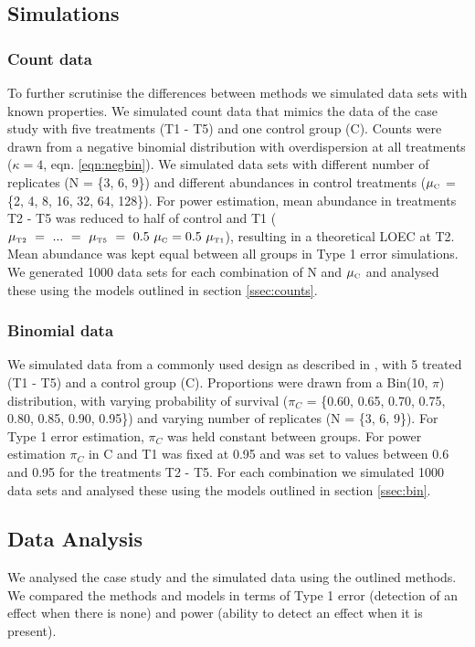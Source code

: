 \documentclass[twocolumn, natbib]{svjour3}
\begin{document}
\subsection{Simulations}
\subsubsection{Count data}
To further scrutinise the differences between methods we simulated data sets with known properties.
We simulated count data that mimics the data of the case study with five treatments (T1 - T5) and one control group (C).
Counts were drawn from a negative binomial distribution with overdispersion at all treatments ($\kappa = 4$, eqn. \ref{eqn:negbin}).
We simulated data sets with different number of replicates (N = \{3, 6, 9\}) and different abundances in control treatments ($\mu_\text{\tiny C}$ = \{2, 4, 8, 16, 32, 64, 128\}). 
For power estimation, mean abundance in treatments T2 - T5 was reduced to half of control and T1 ($\mu_\text{\tiny T2}~=~...~=~\mu_\text{\tiny T5}~=~0.5~\mu_\text{\tiny C} = 0.5~\mu_\text{\tiny T1}$), resulting in a theoretical LOEC at T2.
Mean abundance was kept equal between all groups in Type 1 error simulations.
We generated 1000 data sets for each combination of N and $\mu_\text{\tiny C}$ and analysed these using the models outlined in section \ref{ssec:counts}.


\subsubsection{Binomial data}
We simulated data from a commonly used design as described in \citet{weber_short-term_1989}, with 5 treated (T1 - T5) and a control group (C). 
Proportions were drawn from a Bin(10, $\pi$) distribution, with varying probability of survival ($\pi_C$ = \{0.60, 0.65, 0.70, 0.75, 0.80, 0.85, 0.90, 0.95\}) and varying number of replicates (N = \{3, 6, 9\}).
For Type 1 error estimation, $\pi_C$ was held constant between groups.
For power estimation $\pi_C$ in C and T1 was fixed at 0.95 and was set to values between 0.6 and 0.95 for the treatments T2 - T5. 
For each combination we simulated 1000 data sets and analysed these using the models outlined in section \ref{ssec:bin}.

\subsection{Data Analysis}
We analysed the case study and the simulated data using the outlined methods.
We compared the methods and models in terms of Type 1 error (detection of an effect when there is none) and power (ability to detect an effect when it is present).
\end{document}
